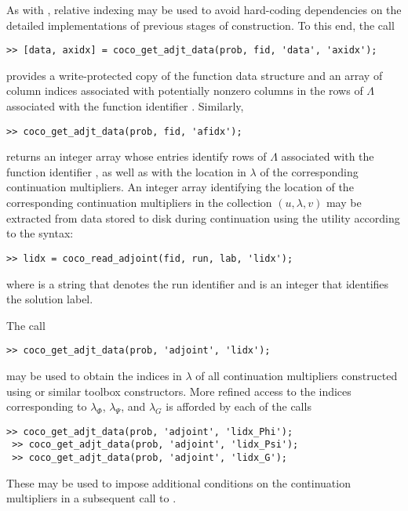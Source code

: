 As with , relative indexing may be used to avoid hard-coding dependencies on the detailed implementations of previous stages of construction.  To this end, the call
\begin{lstlisting}[language=coco-highlight]
 >> [data, axidx] = coco_get_adjt_data(prob, fid, 'data', 'axidx');
\end{lstlisting}
provides a write-protected copy of the function data structure and an array of column indices associated with potentially nonzero columns in the rows of $\Lambda$ associated with the function identifier . Similarly, 
\begin{lstlisting}[language=coco-highlight]
 >> coco_get_adjt_data(prob, fid, 'afidx');
\end{lstlisting}
returns an integer array whose entries identify rows of $\Lambda$ associated with the function identifier , as well as with the location in $\lambda$ of the corresponding continuation multipliers. An integer array identifying the location of the corresponding continuation multipliers in the collection $(u,\lambda,v)$ may be extracted from data stored to disk during continuation using the  utility according to the syntax:
\begin{lstlisting}[language=coco-highlight]
>> lidx = coco_read_adjoint(fid, run, lab, 'lidx');
\end{lstlisting}
where  is a string that denotes the run identifier and  is an integer that identifies the solution label.

The call 
\begin{lstlisting}[language=coco-highlight]
 >> coco_get_adjt_data(prob, 'adjoint', 'lidx');
\end{lstlisting}
may be used to obtain the indices in $\lambda$ of all continuation multipliers constructed using  or similar toolbox constructors. More refined access to the indices corresponding to $\lambda_\Phi$, $\lambda_\Psi$, and $\lambda_G$ is afforded by each of the calls
\begin{lstlisting}[language=coco-highlight]
 >> coco_get_adjt_data(prob, 'adjoint', 'lidx_Phi');
 >> coco_get_adjt_data(prob, 'adjoint', 'lidx_Psi');
 >> coco_get_adjt_data(prob, 'adjoint', 'lidx_G');
\end{lstlisting}
These may be used to impose additional conditions on the continuation multipliers in a subsequent call to .


